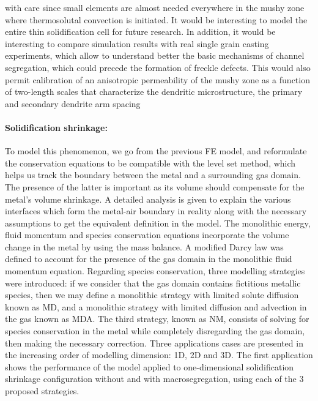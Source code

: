 with care since small elements are almost needed everywhere in the mushy zone where thermosolutal convection is initiated.   
It would be interesting to model the entire thin solidification cell for future research. In addition, it would be interesting to compare simulation
results with real single grain casting experiments, which allow to understand better the basic mechanisms of channel segregation, 
which could precede the formation of freckle defects. This would also permit calibration of an anisotropic permeability of the mushy zone as a 
function of two-length scales that characterize the dendritic microstructure, the primary and secondary dendrite arm spacing

\paragraph{Solidification shrinkage:}
To model this phenomenon, we go from the previous FE model, and reformulate the conservation equations to be compatible with the level set method,
which helps us track the boundary between the metal and a surrounding gas domain. The presence of the latter is important as its volume should compensate
for the metal's volume shrinkage. A detailed analysis is given to explain the various interfaces which form the metal-air boundary in reality along
with the necessary assumptions to get the equivalent definition in the model.
The monolithic energy, fluid momentum and species conservation equations incorporate the volume change in the metal by using the mass balance.
A modified Darcy law was defined to account for the presence of the gas domain in the monolithic fluid momentum equation.
Regarding species conservation, three modelling strategies were introduced: if we consider that the gas domain contains fictitious metallic species, 
then we may define a monolithic strategy with limited solute diffusion known as MD, and a monolithic strategy with limited diffusion and advection in the gas known as MDA.
The third strategy, known as NM, consists of solving for species conservation in the metal while 
completely disregarding the gas domain, then making the necessary correction. 
\newline
Three applications cases are presented in the increasing order of modelling dimension: 1D, 2D and 3D. 
The first application shows the performance of the model
applied to one-dimensional solidification shrinkage configuration without and with macrosegregation, using each of the 3 proposed strategies.
